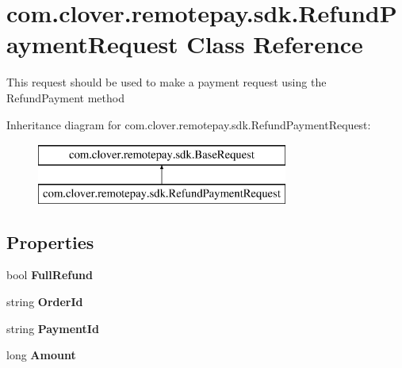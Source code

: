 \hypertarget{classcom_1_1clover_1_1remotepay_1_1sdk_1_1_refund_payment_request}{}\section{com.\+clover.\+remotepay.\+sdk.\+Refund\+Payment\+Request Class Reference}
\label{classcom_1_1clover_1_1remotepay_1_1sdk_1_1_refund_payment_request}


This request should be used to make a payment request using the Refund\+Payment method  


Inheritance diagram for com.\+clover.\+remotepay.\+sdk.\+Refund\+Payment\+Request\+:\begin{figure}[H]
\begin{center}
\leavevmode
\includegraphics[height=2.000000cm]{classcom_1_1clover_1_1remotepay_1_1sdk_1_1_refund_payment_request}
\end{center}
\end{figure}
\subsection*{Properties}
\begin{DoxyCompactItemize}
\item 
\mbox{\label{classcom_1_1clover_1_1remotepay_1_1sdk_1_1_refund_payment_request_aa01e28327a3f52c1bf0cd7fc33efdd42}} 
bool {\bfseries Full\+Refund}
\item 
\mbox{\label{classcom_1_1clover_1_1remotepay_1_1sdk_1_1_refund_payment_request_ae75bc272ad1898e519d7c7c40dcbf05f}} 
string {\bfseries Order\+Id}
\item 
\mbox{\label{classcom_1_1clover_1_1remotepay_1_1sdk_1_1_refund_payment_request_a4cf837d718d5fc7cca845909072e8822}} 
string {\bfseries Payment\+Id}
\item 
\mbox{\label{classcom_1_1clover_1_1remotepay_1_1sdk_1_1_refund_payment_request_aa8ce46b848c4cfe2bea40299246c3274}} 
long {\bfseries Amount}
\end{DoxyCompactItemize}


